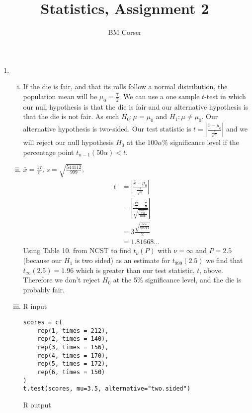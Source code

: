 \documentclass[10pt]{article}
\author{BM Corser}
\title{Statistics, Assignment 2}
\begin{document}
    \maketitle 
    \begin{enumerate}
        \item
            \begin{enumerate}[(i)]
                \item If the die is fair, and that its rolls follow a normal
                    distribution, the population mean will be $\mu_0 =
                    \frac{7}{2}$. We can use a one sample $t$-test in which our
                    null hypothesis is that the die is fair and our alternative
                    hypothesis is that the die is not fair.  As such $H_0: \mu
                    = \mu_0$ and $H_1: \mu \neq \mu_0$. Our alternative
                    hypothesis is two-sided. Our test statistic is $t =
                    \left|\frac{\bar{x} - \mu_0}{\frac{s}{\sqrt{n}}}\right|$
                    and we will reject our null hypothesis $H_0$ at the
                    $100\alpha \%$ significance level if the percentage point
                    $t_{n-1}(50\alpha) < t$.
                \item $\bar{x} =
                    \frac{17}{5}$, $s = \sqrt{\frac{544112}{999}}$,
                    \begin{align*}
                        t &= \left|\frac{\bar{x} - \mu_0}{\frac{s}{\sqrt{n}}}\right| \\
                          &= \left|\frac{\frac{17}{5} - \frac{7}{2}}{\sqrt{\frac{\frac{544112}{999}}{1000}}}\right| \\
                          &= 3\frac{\sqrt{\frac{555}{68014}}}{2} \\
                          &= 1.81668...
                    \end{align*}
                    Using Table 10. from NCST to find $t_\nu(P)$ with $\nu =
                    \infty$ and $P = 2.5$ (because our $H_1$ is two sided)  as
                    an estimate for $t_{999}(2.5)$ we find that $t_\infty(2.5)
                    = 1.96$ which is greater than our test statistic, $t$,
                    above. Therefore we don't reject $H_0$ at the 5\%
                    significance level, and the die is probably fair.
                    \pagebreak
                \item
                    R input
                    \begin{verbatim}
scores = c(
    rep(1, times = 212),
    rep(2, times = 140),
    rep(3, times = 156),
    rep(4, times = 170),
    rep(5, times = 172),
    rep(6, times = 150)
)
t.test(scores, mu=3.5, alternative="two.sided")
                    \end{verbatim}
                    R output
                    \begin{verbatim}


\end{verbatim}
\end{enumerate}
\end{enumerate}
\end{document}
